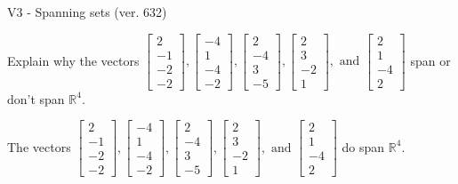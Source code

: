 \begin{exercise}
  \begin{exerciseTitle}V3 - Spanning sets (ver. 632)\end{exerciseTitle}
  \begin{exerciseStatement}
    Explain why the vectors \(\left[\begin{array}{r}
2 \\
-1 \\
-2 \\
-2
\end{array}\right] , \left[\begin{array}{r}
-4 \\
1 \\
-4 \\
-2
\end{array}\right] , \left[\begin{array}{r}
2 \\
-4 \\
3 \\
-5
\end{array}\right] , \left[\begin{array}{r}
2 \\
3 \\
-2 \\
1
\end{array}\right] , \text{ and } \left[\begin{array}{r}
2 \\
1 \\
-4 \\
2
\end{array}\right]\) span or don't span \(\mathbb{R}^4\). 
	


  \end{exerciseStatement}
  \begin{exerciseAnswer}
   The vectors \(\left[\begin{array}{r}
2 \\
-1 \\
-2 \\
-2
\end{array}\right] , \left[\begin{array}{r}
-4 \\
1 \\
-4 \\
-2
\end{array}\right] , \left[\begin{array}{r}
2 \\
-4 \\
3 \\
-5
\end{array}\right] , \left[\begin{array}{r}
2 \\
3 \\
-2 \\
1
\end{array}\right] , \text{ and } \left[\begin{array}{r}
2 \\
1 \\
-4 \\
2
\end{array}\right]\) 
  	 do  
	span \(\mathbb{R}^4\).
  



\end{exerciseAnswer}
\end{exercise}
